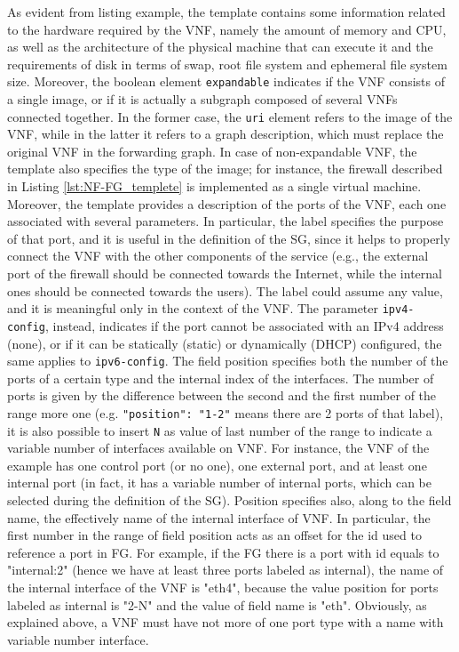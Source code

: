 

As evident from listing example, the template contains some information related to the hardware required by the VNF, namely the amount of memory and CPU, as well as the architecture of the physical machine that can execute it and the requirements of disk in terms of swap, root file system and ephemeral file system size. Moreover, the boolean element \texttt{expandable} indicates if the VNF consists of a single image, or if it is actually a subgraph composed of several VNFs connected together. In the former case, the \texttt{uri} element refers to the image of the VNF, while in the latter it refers to a graph description, which must replace the original VNF in the forwarding graph. In case of non-expandable VNF, the template also specifies the type of the image; for instance, the firewall described in Listing \ref{lst:NF-FG_templete} is implemented as a single virtual machine.
Moreover, the template provides a description of the ports of the VNF, each one associated with several parameters. In particular, the label specifies the purpose of that port, and it is useful in the definition of the SG, since it helps to properly connect the VNF with the other components of the service (e.g., the external port of the firewall should be connected towards the Internet, while the internal ones should be connected towards the users). The label could assume any value, and it is meaningful only in the context of the VNF. The parameter \texttt{ipv4-config}, instead, indicates if the port cannot be associated with an IPv4 address (none), or if it can be statically (static) or dynamically (DHCP) configured, the same applies to \texttt{ipv6-config}. The field position specifies both the number of the ports of a certain type and the internal index of the interfaces. The number of ports is given by the difference between the second and the first  number of the range more one (e.g. \texttt{"position": "1-2"} means there are 2 ports of that label), it is also possible to insert \texttt{N} as value of last number of the range to indicate a variable number of interfaces available on VNF. For instance, the VNF of the example has one control port (or no one), one external port, and at least one internal port (in fact, it has a variable number of internal ports, which can be selected during the definition of the SG).  Position specifies also, along to the field name, the effectively name of the internal interface of VNF. In particular, the first number in the range of field position acts as an offset for the id used to reference a port in FG. For example, if the FG there is a port with id equals to "internal:2" (hence we have at least three ports labeled as internal), the name of the internal interface of the VNF is "eth4", because the value position for ports labeled as internal is "2-N" and the value of field name is "eth".
Obviously, as explained above, a VNF must have not more of one port type with a name with variable number interface.

